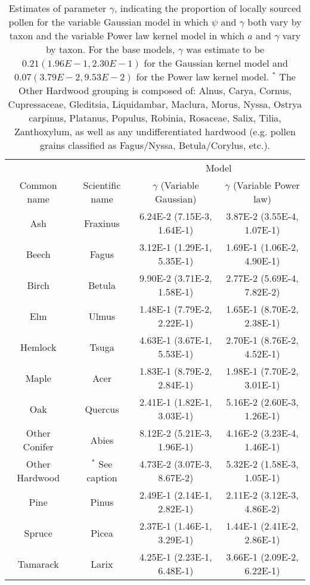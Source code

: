 \begin{table}
\begin{center}
\begin{tabular}{cccc} 
\toprule
               &                 & \multicolumn{2}{c}{Model} \\
Common name    & Scientific name & $\gamma$ (Variable Gaussian) & $\gamma$ (Variable Power law) \\  \midrule
           Ash & Fraxinus        & 6.24E-2 (7.15E-3, 1.64E-1)   & 3.87E-2 (3.55E-4, 1.07E-1)    \\
         Beech & Fagus           & 3.12E-1 (1.29E-1, 5.35E-1)   & 1.69E-1 (1.06E-2, 4.90E-1)    \\
         Birch & Betula          & 9.90E-2 (3.71E-2, 1.58E-1)   & 2.77E-2 (5.69E-4, 7.82E-2)    \\
           Elm & Ulmus           & 1.48E-1 (7.79E-2, 2.22E-1)   & 1.65E-1 (8.70E-2, 2.38E-1)    \\
       Hemlock & Tsuga           & 4.63E-1 (3.67E-1, 5.53E-1)   & 2.70E-1 (8.76E-2, 4.52E-1)    \\
         Maple & Acer            & 1.83E-1 (8.79E-2, 2.84E-1)   & 1.98E-1 (7.70E-2, 3.01E-1)    \\
           Oak & Quercus         & 2.41E-1 (1.82E-1, 3.03E-1)   & 5.16E-2 (2.60E-3, 1.26E-1)    \\
 Other Conifer & Abies           & 8.12E-2 (5.21E-3, 1.96E-1)   & 4.16E-2 (3.23E-4, 1.46E-1)    \\
Other Hardwood & $^{*}$ See caption    & 4.73E-2 (3.07E-3, 8.67E-2)   & 5.32E-2 (1.58E-3, 1.05E-1)    \\
          Pine & Pinus           & 2.49E-1 (2.14E-1, 2.82E-1)   & 2.11E-2 (3.12E-3, 4.86E-2)    \\
        Spruce & Picea           & 2.37E-1 (1.46E-1, 3.29E-1)   & 1.44E-1 (2.41E-2, 2.86E-1)    \\
      Tamarack & Larix           & 4.25E-1 (2.23E-1, 6.48E-1)   & 3.66E-1 (2.09E-2, 6.22E-1)    \\ \bottomrule
\end{tabular}
\caption{Estimates of parameter $\gamma$, indicating the proportion of locally sourced pollen for the variable Gaussian model in which $\psi$ and $\gamma$ both vary by taxon and the variable Power law kernel model in which $a$ and $\gamma$ vary by taxon. For the base models, $\gamma$ was estimate to be $0.21  (1.96E-1, 2.30E-1) $ for the Gaussian kernel model and $0.07  (3.79E-2, 9.53E-2) $ for the Power law kernel model. $^{*}$ The Other Hardwood grouping is composed of: Alnus, Carya, Cornus, Cupressaceae, Gleditsia, Liquidambar, Maclura, Morus, Nyssa, Ostrya carpinus, Platanus, Populus, Robinia, Rosaceae, Salix, Tilia, Zanthoxylum, as well as any undifferentiated hardwood (e.g. pollen grains classified as Fagus/Nyssa, Betula/Corylus, etc.).}
\end{center}
\label{table:gamma}
\vspace{2cm}
\end{table}


